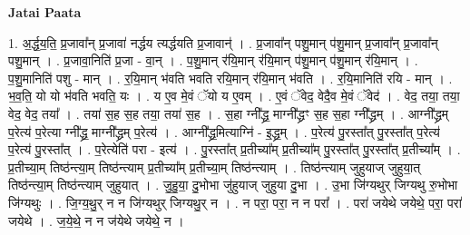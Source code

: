 \documentclass[17pt]{extarticle}
\begin{document}
\textbf{Jatai Paata} \newline

1. अ॒र्द्ध॒य॒ति॒ प्र॒जावा᳚न् प्र॒जावा॑ नर्द्धय त्यर्द्धयति प्र॒जावान्॑ । . प्र॒जावा᳚न् पशु॒मान् प॑शु॒मान् प्र॒जावा᳚न् प्र॒जावा᳚न् पशु॒मान् । . प्र॒जावा॒निति॑ प्र॒जा - वा॒न् । . प॒शु॒मान् र॑यि॒मान् र॑यि॒मान् प॑शु॒मान् प॑शु॒मान् र॑यि॒मान् । . प॒शु॒मानिति॑ पशु - मान् । . र॒यि॒मान् भ॑वति भवति रयि॒मान् र॑यि॒मान् भ॑वति । . र॒यि॒मानिति॑ रयि - मान् । . भ॒व॒ति॒ यो यो भ॑वति भवति॒ यः । . य ए॒व मे॒वं ॅयो य ए॒वम् । . ए॒वं ॅवेद॒ वेदै॒व मे॒वं ॅवेद॑ । . वेद॒ तया॒ तया॒ वेद॒ वेद॒ तया᳚ । . तया॑ स॒ह स॒ह तया॒ तया॑ स॒ह । . स॒हा ग्नी᳚द्ध्र॒ माग्नी᳚द्ध्रꣳ स॒ह स॒हा ग्नी᳚द्ध्रम् । . आग्नी᳚द्ध्रम् प॒रेत्य॑ प॒रेत्या ग्नी᳚द्ध्र॒ माग्नी᳚द्ध्रम् प॒रेत्य॑ । . आग्नी᳚द्ध्र॒मित्याग्नि॑ - इ॒द्ध्र॒म् । . प॒रेत्य॑ पु॒रस्ता᳚त् पु॒रस्ता᳚त् प॒रेत्य॑ प॒रेत्य॑ पु॒रस्ता᳚त् । . प॒रेत्येति॑ परा - इत्य॑ । . पु॒रस्ता᳚त् प्र॒तीच्या᳚म् प्र॒तीच्या᳚म् पु॒रस्ता᳚त् पु॒रस्ता᳚त् प्र॒तीच्या᳚म् । . प्र॒तीच्या॒म् तिष्ठ॑न्त्या॒म् तिष्ठ॑न्त्याम् प्र॒तीच्या᳚म् प्र॒तीच्या॒म् तिष्ठ॑न्त्याम् । . तिष्ठ॑न्त्याम् जुहुयाज् जुहुया॒त् तिष्ठ॑न्त्या॒म् तिष्ठ॑न्त्याम् जुहुयात् । . जु॒हु॒या॒ दु॒भोभा जु॑हुयाज् जुहुया दु॒भा । . उ॒भा जि॑ग्यथुर् जिग्यथु रु॒भोभा जि॑ग्यथुः । . जि॒ग्य॒थु॒र् न न जि॑ग्यथुर् जिग्यथु॒र् न । . न परा॒ परा॒ न न परा᳚ । . परा॑ जयेथे जयेथे॒ परा॒ परा॑ जयेथे । . ज॒ये॒थे॒ न न ज॑येथे जयेथे॒ न । \newline
\end{document}
